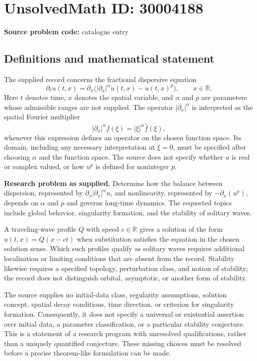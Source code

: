 \documentclass[11pt]{article}
\newcommand{\R}{\mathbb{R}}
\begin{document}
\section*{UnsolvedMath ID: 30004188}
\textbf{Source problem code:} catalogue entry
\subsection{Definitions and mathematical statement}
The supplied record concerns the fractional dispersive equation
\[
\partial_t u(t,x)=\partial_x\bigl(|\partial_x|^\alpha u(t,x)-u(t,x)^p\bigr),\qquad x\in\R.
\]
Here \(t\) denotes time, \(x\) denotes the spatial variable, and \(\alpha\) and \(p\) are parameters whose admissible ranges are not supplied. The operator \(|\partial_x|^\alpha\) is interpreted as the spatial Fourier multiplier
\[
\widehat{|\partial_x|^\alpha f}(\xi)=|\xi|^\alpha\widehat f(\xi),
\]
whenever this expression defines an operator on the chosen function space. Its domain, including any necessary interpretation at \(\xi=0\), must be specified after choosing \(\alpha\) and the function space. The source does not specify whether \(u\) is real or complex valued, or how \(u^p\) is defined for noninteger \(p\).

\textbf{Research problem as supplied.} Determine how the balance between dispersion, represented by \(\partial_x|\partial_x|^\alpha u\), and nonlinearity, represented by \(-\partial_x(u^p)\), depends on \(\alpha\) and \(p\) and governs long-time dynamics. The requested topics include global behavior, singularity formation, and the stability of solitary waves.

A traveling-wave profile \(Q\) with speed \(c\in\R\) gives a solution of the form \(u(t,x)=Q(x-ct)\) when substitution satisfies the equation in the chosen solution sense. Which such profiles qualify as solitary waves requires additional localization or limiting conditions that are absent from the record. Stability likewise requires a specified topology, perturbation class, and notion of stability; the record does not distinguish orbital, asymptotic, or another form of stability.

The source supplies no initial-data class, regularity assumptions, solution concept, spatial decay conditions, time direction, or criterion for singularity formation. Consequently, it does not specify a universal or existential assertion over initial data, a parameter classification, or a particular stability conjecture. This is a statement of a research program with unresolved qualifications, rather than a uniquely quantified conjecture. These missing choices must be resolved before a precise theorem-like formulation can be made.
\end{document}
